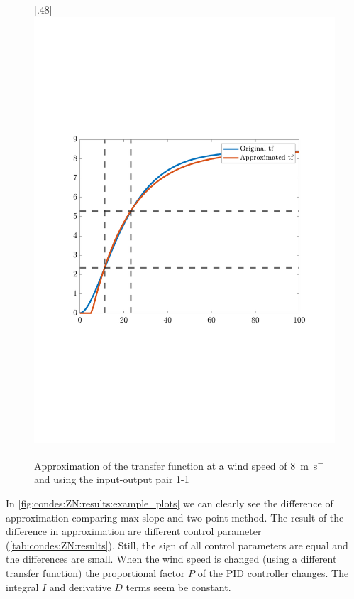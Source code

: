 \begin{figure}[H]
    [.48\textwidth]{\includegraphics[width=1\linewidth, scale=1, trim=75 230 55 120,clip]{fig/G_11_2p_8ms.pdf}}

    \caption{Approximation of the transfer function at a wind speed of \SI{8}{\metre\per\second} and using the input-output pair 1-1}
    \label{fig:condes:ZN:results:example_plots}
\end{figure}

In \autoref{fig:condes:ZN:results:example_plots} we can clearly see the difference of approximation comparing max-slope and two-point method.
The result of the difference in approximation are different control parameter (\autoref{tab:condes:ZN:results}).
Still, the sign of all control parameters are equal and the differences are small.
When the wind speed is changed (using a different transfer function) the proportional factor $P$ of the PID controller changes.
The integral $I$ and derivative $D$ terms seem be constant.

